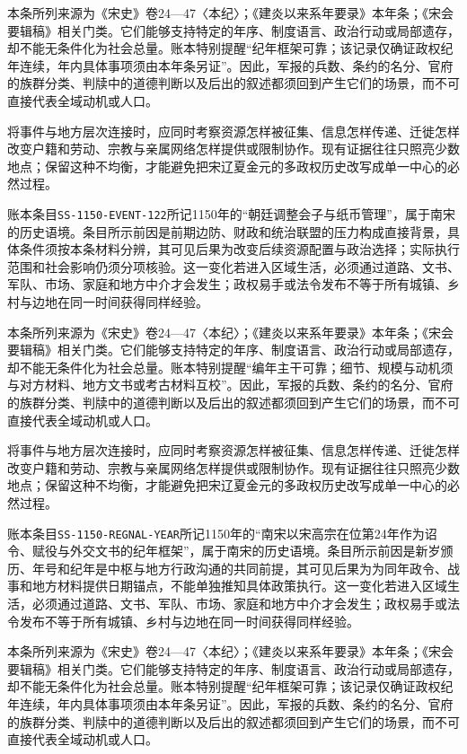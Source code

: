 本条所列来源为《宋史》卷24—47〈本纪〉；《建炎以来系年要录》本年条；《宋会要辑稿》相关门类。它们能够支持特定的年序、制度语言、政治行动或局部遗存，却不能无条件化为社会总量。账本特别提醒“纪年框架可靠；该记录仅确证政权纪年连续，年内具体事项须由本年条另证”。因此，军报的兵数、条约的名分、官府的族群分类、判牍中的道德判断以及后出的叙述都须回到产生它们的场景，而不可直接代表全域动机或人口。

将事件与地方层次连接时，应同时考察资源怎样被征集、信息怎样传递、迁徙怎样改变户籍和劳动、宗教与亲属网络怎样提供或限制协作。现有证据往往只照亮少数地点；保留这种不均衡，才能避免把宋辽夏金元的多政权历史改写成单一中心的必然过程。

账本条目\texttt{SS-1150-EVENT-122}所记1150年的“朝廷调整会子与纸币管理”，属于南宋的历史语境。条目所示前因是前期边防、财政和统治联盟的压力构成直接背景，具体条件须按本条材料分辨，其可见后果为改变后续资源配置与政治选择；实际执行范围和社会影响仍须分项核验。这一变化若进入区域生活，必须通过道路、文书、军队、市场、家庭和地方中介才会发生；政权易手或法令发布不等于所有城镇、乡村与边地在同一时间获得同样经验。

本条所列来源为《宋史》卷24—47〈本纪〉；《建炎以来系年要录》本年条；《宋会要辑稿》相关门类。它们能够支持特定的年序、制度语言、政治行动或局部遗存，却不能无条件化为社会总量。账本特别提醒“编年主干可靠；细节、规模与动机须与对方材料、地方文书或考古材料互校”。因此，军报的兵数、条约的名分、官府的族群分类、判牍中的道德判断以及后出的叙述都须回到产生它们的场景，而不可直接代表全域动机或人口。

将事件与地方层次连接时，应同时考察资源怎样被征集、信息怎样传递、迁徙怎样改变户籍和劳动、宗教与亲属网络怎样提供或限制协作。现有证据往往只照亮少数地点；保留这种不均衡，才能避免把宋辽夏金元的多政权历史改写成单一中心的必然过程。

账本条目\texttt{SS-1150-REGNAL-YEAR}所记1150年的“南宋以宋高宗在位第24年作为诏令、赋役与外交文书的纪年框架”，属于南宋的历史语境。条目所示前因是新岁颁历、年号和纪年是中枢与地方行政沟通的共同前提，其可见后果为为同年政令、战事和地方材料提供日期锚点，不能单独推知具体政策执行。这一变化若进入区域生活，必须通过道路、文书、军队、市场、家庭和地方中介才会发生；政权易手或法令发布不等于所有城镇、乡村与边地在同一时间获得同样经验。

本条所列来源为《宋史》卷24—47〈本纪〉；《建炎以来系年要录》本年条；《宋会要辑稿》相关门类。它们能够支持特定的年序、制度语言、政治行动或局部遗存，却不能无条件化为社会总量。账本特别提醒“纪年框架可靠；该记录仅确证政权纪年连续，年内具体事项须由本年条另证”。因此，军报的兵数、条约的名分、官府的族群分类、判牍中的道德判断以及后出的叙述都须回到产生它们的场景，而不可直接代表全域动机或人口。

